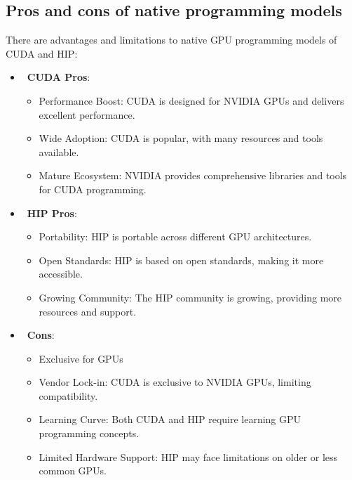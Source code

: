 

\subsection{Pros and cons of native programming models}


\par
There are advantages and limitations to native GPU programming models of CUDA and HIP:
\begin{itemize}
    \item~\textbf{CUDA Pros}:
    \begin{itemize}
        \item Performance Boost: CUDA is designed for NVIDIA GPUs and delivers excellent performance.
        \item Wide Adoption: CUDA is popular, with many resources and tools available.
        \item Mature Ecosystem: NVIDIA provides comprehensive libraries and tools for CUDA programming.
    \end{itemize}
    \item~\textbf{HIP Pros}:
    \begin{itemize}
        \item Portability: HIP is portable across different GPU architectures.
        \item Open Standards: HIP is based on open standards, making it more accessible.
        \item Growing Community: The HIP community is growing, providing more resources and support.
    \end{itemize}
    \item~\textbf{Cons}:
    \begin{itemize}
        \item Exclusive for GPUs
        \item Vendor Lock-in: CUDA is exclusive to NVIDIA GPUs, limiting compatibility.
        \item Learning Curve: Both CUDA and HIP require learning GPU programming concepts.
        \item Limited Hardware Support: HIP may face limitations on older or less common GPUs.
    \end{itemize}
\end{itemize}

